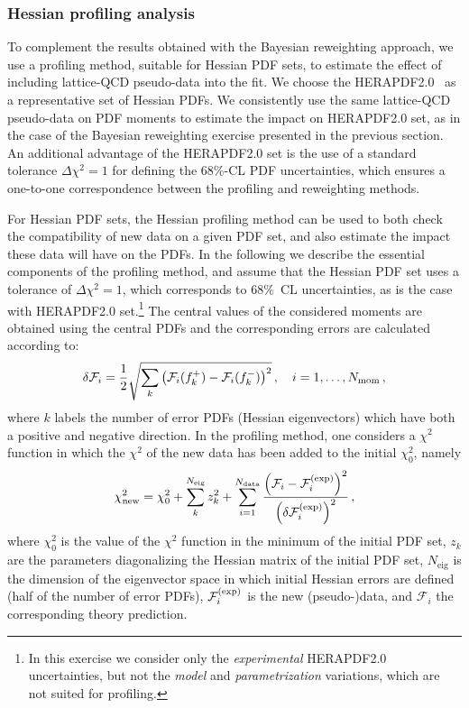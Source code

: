 \subsubsection{Hessian profiling analysis}
\label{sec:hessianprofiling}

To complement the results obtained
with the Bayesian reweighting approach,
we use a profiling method, suitable
for Hessian PDF sets, to estimate the effect of including
lattice-QCD pseudo-data into the fit. 
%
We
choose the HERAPDF2.0~\cite{Abramowicz:2015mha}
as a representative set of Hessian PDFs.
%
We consistently use the same lattice-QCD
pseudo-data on PDF moments to estimate the impact
on HERAPDF2.0 set, as in the case of the Bayesian reweighting
exercise presented in the previous section.
%
An additional advantage of the HERAPDF2.0 set is
the use
of a standard tolerance
$\Delta\chi^2=1$ for defining the 68\%-CL PDF
uncertainties, which ensures a
one-to-one correspondence between
the profiling and reweighting methods.

For Hessian PDF sets, the Hessian profiling method
can be used to both check the compatibility of new data on a given PDF set,
and also  estimate the impact these data will have on the PDFs. 
In the following we describe the essential components of the profiling method, 
and assume  that the  Hessian PDF set uses a tolerance of $\Delta\chi^2=1$, 
which corresponds to 68\%~CL uncertainties,
as is the case with HERAPDF2.0 set.\footnote{In this exercise
we consider only the {\it experimental} HERAPDF2.0
uncertainties, but not the {\it model} and {\it parametrization}
variations, which are not suited for profiling.}
%
The central values of the considered moments are obtained using the central PDFs and the corresponding
errors are calculated according to:
\begin{equation}
\delta\mathcal{F}_i = \frac{1}{2} \sqrt{\sum_{k}\left(\mathcal{F}_i(f_k^+)-\mathcal{F}_i(f_k^-)\right)^2}\, ,
\quad i=1,\ldots,N_{\rm mom} \, ,
\end{equation}
where $k$ labels the number of error PDFs (Hessian eigenvectors)
which have both a positive and negative direction.
%
In the profiling method, one considers a $\chi^2$ function in which the $\chi^2$ of the new
data has been added to the initial $\chi^2_0$, namely
\begin{equation}
\label{eq:newchi2}
\chi^2_{\text{new}} = \chi_0^2 + \sum_{k}^{N_{\text{eig}}} z_k^2
                    + \sum_{i=1}^{N_{\text{data}}}
                      \frac{\lp \mathcal{F}_i - \mathcal{F}_i^{\rm(exp)}\rp^2}
                           {\lp\delta\mathcal{F}_i^{\rm(exp)}\rp^2}\,,
\end{equation}
where $\chi^2_0$ is the value of the $\chi^2$ function in the minimum of the initial PDF set,
$z_k$ are the parameters diagonalizing the Hessian matrix of the initial PDF set,
$N_{\text{eig}}$ is the dimension of the eigenvector space in which initial Hessian errors are defined
(half of the number of error PDFs), $\mathcal{F}_i^{\rm(exp)}$ is the new
(pseudo-)data,
and $\mathcal{F}_i$ the corresponding theory prediction.

